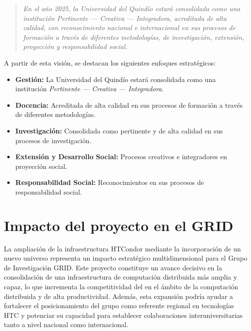 \begin{quote}
	\textit{En el año 2025, la Universidad del Quindío estará consolidada como una institución \textit{Pertinente --- Creativa --- Integradora}, acreditada de alta calidad, con reconocimiento nacional e internacional en sus procesos de formación a través de diferentes metodologías, de investigación, extensión, proyección y responsabilidad social.}
\end{quote}

A partir de esta visión, se destacan los siguientes enfoques estratégicos:

\begin{itemize}
	\item \textbf{Gestión:} La Universidad del Quindío estará consolidada como una institución \textit{Pertinente --- Creativa --- Integradora}.

	\item \textbf{Docencia:} Acreditada de alta calidad en sus procesos de formación a través de diferentes metodologías.

	\item \textbf{Investigación:} Consolidada como pertinente y de alta calidad en sus procesos de investigación.

	\item \textbf{Extensión y Desarrollo Social:} Procesos creativos e integradores en proyección social.

	\item \textbf{Responsabilidad Social:} Reconocimientos en sus procesos de responsabilidad social.
\end{itemize}

\section{Impacto del proyecto en el GRID}
La ampliación de la infraestructura HTCondor mediante la incorporación de un nuevo universo representa un impacto estratégico multidimensional para el Grupo de Investigación GRID. Este proyecto constituye un avance decisivo en la consolidación de una infraestructura de computación distribuida más amplia y capaz, lo que incrementa la competitividad del \GRID en el ámbito de la computación distribuida y de alta productividad. Además, esta expansión podría ayudar a fortalecer el posicionamiento del grupo como referente regional en tecnologías HTC y potenciar su capacidad para establecer colaboraciones interuniversitarias tanto a nivel nacional como internacional.


